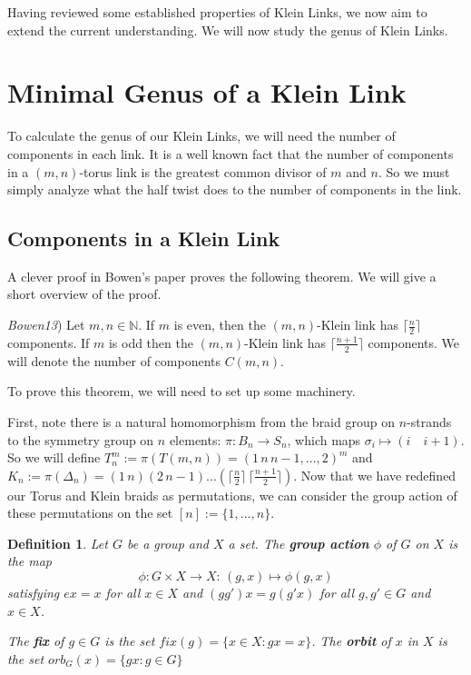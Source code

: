 \documentclass[12pt]{article}
\newtheorem{definition}{Definition}[section]
\newenvironment{theorem}[2][Theorem]{\begin{trivlist}
\item[\hskip \labelsep {\bfseries #1}\hskip \labelsep {\bfseries #2.}]}{\end{trivlist}}
\begin{document}
Having reviewed some established properties of Klein Links, we now aim to extend the current understanding. We will now study the genus of Klein Links.

\section{Minimal Genus of a Klein Link}

To calculate the genus of our Klein Links, we will need the number of components in each link. It is a well known fact that the number of components in a $(m, n)$-torus link is the greatest common divisor of $m$ and $n$. So we must simply analyze what the half twist does to the number of components in the link.

\subsection{Components in a Klein Link}

A clever proof in Bowen's paper proves the following theorem. We will give a short overview of the proof.

\begin{theorem}{2.1} (\textit{Bowen13})
Let $m, n \in \mathds{N}$. If $m$ is even, then the $(m, n)$-Klein link has $\lceil \frac{n}{2} \rceil$  components. If $m$ is odd then the $(m, n)$-Klein link has $\lceil \frac{n + 1}{2} \rceil$ components. We will denote the number of components $C(m, n)$.
\end{theorem}

To prove this theorem, we will need to set up some machinery. 

First, note there is a natural homomorphism from the braid group on $n$-strands to the symmetry group on $n$ elements: $\pi:B_n \rightarrow S_n$, which maps $\sigma_i \mapsto (i \quad i+1)$. So we will define $T_n^m :=\pi(T(m, n)) = (1 \, n \, n-1 , ... , 2)^m$ and $K_n :=\pi(\Delta_n) = (1 \, n) (2 \, n-1) ... \left(\lceil\frac{n}{2}\rceil \, \lceil \frac{n+1}{2}\rceil \right)$.  Now that we have redefined our Torus and Klein braids as permutations, we can consider the group action of these permutations on the set $[n] := \{1, ..., n\}$.

\begin{definition}
Let $G$ be a group and $X$ a set. The \textbf{group action} $\phi$ of $G$ on $X$ is the map $$\phi:G\times X \rightarrow X : \, (g, x) \mapsto \phi(g, x)$$ satisfying $ex = x$ for all $x \in X$ and $(gg')x = g(g'x)$ for all $g, g' \in G$ and $x\in X$.

The \textbf{fix} of $g \in G$ is the set $fix(g) = \{x \in X: gx = x \}$. The \textbf{orbit} of $x$ in $X$ is the set $orb_G(x) = \{gx : g \in G \}$
\end{definition}
\end{document}
